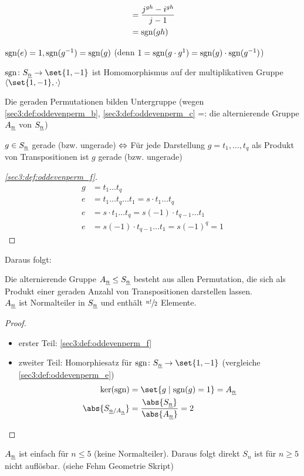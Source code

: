 \begin{definition}
\begin{defenum}
\begin{align*}
			&= \frac{j^{gh}-i^{gh}}{j-1}\\
			&= \operatorname{sgn}(gh)
		\end{align*} \label{sec3:def:oddevenperm_b}
		\item $\operatorname{sgn}(e) = 1, \operatorname{sgn}(g^{-1}) = \operatorname{sgn}(g)$ (denn $1 = \operatorname{sgn}(g\cdot g^{1}) = \operatorname{sgn}(g)\cdot \operatorname{sgn}(g^{-1})$) \label{sec3:def:oddevenperm_c}
		\item $\sgn \colon S_{\ul{n}} \to \set{1,-1}$ ist Homomorphismus auf der multiplikativen Gruppe $\gen{\set{1,-1}, \cdot}$
		\item Die geraden Permutationen bilden Untergruppe (wegen \cref{sec3:def:oddevenperm_b}, \cref{sec3:def:oddevenperm_c} =: die alternierende Gruppe $A_{\underline{n}}$ von $S_{\underline{n}}$) \label{sec3:def:oddevenperm_e}
		\item $g \in S_{\underline{n}}$ gerade (bzw. ungerade) $\Leftrightarrow$ Für jede Darstellung $g = t_1,\dots,t_q$ als Produkt von Transpositionen ist $g$ gerade (bzw. ungerade)\label{sec3:def:oddevenperm_f}
		\begin{proof}[\cref{sec3:def:oddevenperm_f}]
			\begin{align*}
				g &= t_1\dots t_q\\
				e &= t_1 \dots t_q \dots t_1 = s\cdot t_1\dots t_q\\
				e &= s\cdot t_1\dots t_q = s(-1)\cdot t_{q-1}\dots t_1\\
				e &= s(-1)\cdot t_{q-1}\dots t_1 = s(-1)^q = 1
			\end{align*}
		\end{proof}
	\end{defenum}
\end{definition}
Daraus folgt:
\begin{proposition}
	Die alternierende Gruppe $A_{\underline{n}} \le S_{\underline{n}}$ besteht aus allen Permutation, die sich als Produkt einer geraden Anzahl von Transpositionen darstellen lassen.\\
	$A_{\underline{n}}$ ist Normalteiler in $S_{\underline{n}}$ und enthält $\sfrac{n!}{2}$ Elemente.
\end{proposition}
\begin{proof}
	\begin{itemize}
		\item erster Teil: \cref{sec3:def:oddevenperm_f}
		\item zweiter Teil: Homorphiesatz für $\sgn \colon S_{\ul{n}} \to \set{1,-1}$ (vergleiche \cref{sec3:def:oddevenperm_e})\\
		\begin{align*}
			\ker (\sgn) &= \set{g \mid \sgn(g) = 1} = A_{\ul{n}}\\
			\abs{S_{\ul{n}/A_{\ul{n}}}} &= \frac{\abs{S_{\ul{n}}}}{\abs{A_{\ul{n}}}} = 2
		\end{align*}
	\end{itemize}
\end{proof}
\begin{remark}
	$A_{\underline{n}}$ ist einfach für $n \le 5$ (keine Normalteiler). Daraus folgt direkt $S_n$ ist für $n \ge 5$ nicht auflösbar. (siehe Fehm Geometrie Skript)
\end{remark}